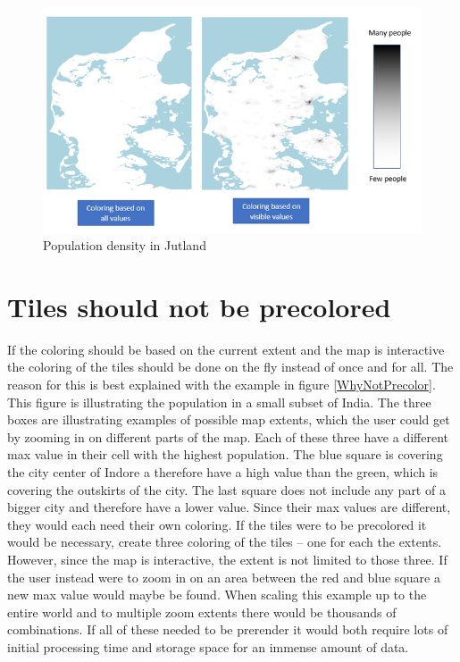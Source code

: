 \begin{figure} [H]
	\centering
	\includegraphics[width=.8\textwidth]{Pictures/WhyLimitToExtent}
	\caption{Population density in Jutland}
	\label{WhyLimitToExtent}
\end{figure}


\section{Tiles should not be precolored}
If the coloring should be based on the current extent and the map is interactive the coloring of the tiles should be done on the fly instead of once and for all. The reason for this is best explained with the example in figure \ref{WhyNotPrecolor}. This figure is illustrating the population in a small subset of India.  The three boxes are illustrating examples of possible map extents, which the user could get by zooming in on different parts of the map. Each of these three have a different max value in their cell with the highest population. The blue square is covering the city center of Indore a therefore have a high value than the green, which is covering the outskirts of the city. The last square does not include any part of a bigger city and therefore have a lower value. 
Since their max values are different, they would each need their own coloring. If the tiles were to be precolored it would be necessary, create three coloring of the tiles – one for each the extents. However, since the map is interactive, the extent is not limited to those three. If the user instead were to zoom in on an area between the red and blue square a new max value would maybe be found. When scaling this example up to the entire world and to multiple zoom extents there would be thousands of combinations. If all of these needed to be prerender it would both require lots of initial processing time and storage space for an immense amount of data. 


